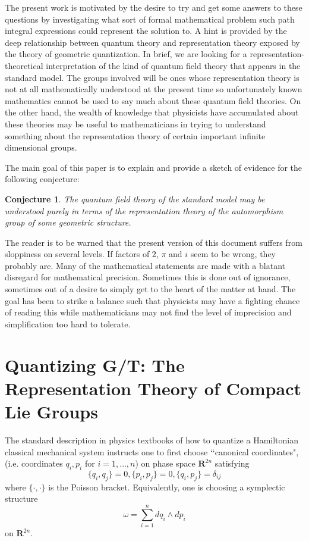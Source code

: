 \documentclass[a4paper,a4paper]{article}
\theoremstyle{conjecture}
\newtheorem*{conjecture}{Conjecture}
\begin{document}
The present work is motivated by the desire to try and get some answers to these
questions by investigating what sort of formal mathematical problem
such path integral expressions could represent the solution to.  A hint is provided by the deep
relationship between quantum theory and representation theory exposed by the theory of geometric
quantization.  In brief, we are looking for a representation-theoretical interpretation of the
kind of quantum field theory that appears in the standard model. The groups involved will be
ones whose representation theory is not at all mathematically understood at the present time so
unfortunately known mathematics cannot be used to say much about these quantum field theories.
On the other hand, the wealth of knowledge that physicists have accumulated about these theories
may be useful to mathematicians in trying to understand something about the representation
theory of certain important infinite dimensional groups.

The main goal of this paper is to explain and provide a sketch of evidence for the following
conjecture:
\begin{conjecture}
The quantum field theory of the standard model may be understood purely in terms
of the representation theory of the automorphism group of some geometric
structure.
\end{conjecture}

The reader is to be warned that the present version of this document suffers from sloppiness
on several levels.  If factors of $2$, $\pi$ and $i$ seem to be wrong, they probably are.
Many of the mathematical statements are made with a blatant disregard for mathematical precision.
Sometimes this is done out of ignorance, sometimes out of a  desire to simply get to
the heart of the matter at hand.  The goal has been to strike a balance such that physicists may
have a fighting chance of reading this while mathematicians may not find the level of imprecision 
and simplification too hard to tolerate.

\section{Quantizing G/T: The Representation Theory of Compact Lie Groups}


The standard description in physics textbooks of how to quantize a
Hamiltonian classical mechanical system instructs one to first
choose \lq\lq canonical coordinates", (i.e. coordinates $q_i, p_i$ for $i=1,\dots,n$) on phase space
${\mathbf R}^{2n}$ satisfying
$$\{q_i, q_j\}=0, \{p_i,p_j\}=0, \{q_i,p_j\}=\delta_{ij}$$
where $\{\cdot,\cdot\}$ is the Poisson bracket. Equivalently, one is choosing a
symplectic structure
$$\omega=\sum_{i=1}^n dq_i\wedge dp_i$$
on ${\mathbf R}^{2n}$.
\end{document}
